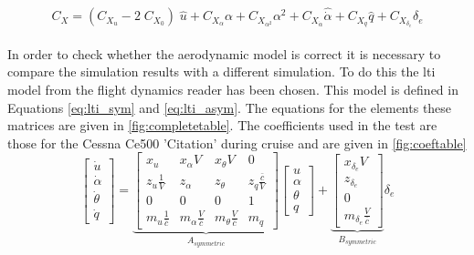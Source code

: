 \begin{equation}
\label{eq:c_x}
{C_X} = ({C_{{X_u}}} - 2\;{C_{{X_0}}})\;\hat u + {C_{{X_\alpha }}}\alpha  + {C_{{X_{{\alpha ^2}}}}}{\alpha ^2} + C_{{X_{\dot{\alpha}}}}\hat{\dot{\alpha}}  + {C_{{X_q}}}\hat q + {C_{{X_{{\delta _e}}}}}{\delta _e}
\end{equation}\\

In order to check whether the aerodynamic model is correct it is necessary to compare the simulation results with a different simulation. To do this the \gls{lti} model from the flight dynamics reader\cite{fdreader} has been chosen. This model is defined in Equations \ref{eq:lti_sym} and \ref{eq:lti_asym}. The equations for the elements these matrices are given in \autoref{fig:completetable}. The coefficients used in the test are those for the Cessna Ce500 'Citation' during cruise and are given in \autoref{fig:coeftable}\\


\begin{equation}
\label{eq:lti_sym}
\left[ {\begin{array}{*{20}{c}}
    {\dot u} \\ 
    {\dot \alpha } \\ 
    {\dot \theta } \\ 
    {\dot q} 
\end{array}} \right] = \underbrace {\left[ {\begin{array}{*{20}{c}}
    {{x_u}}&{{x_\alpha }V}&{{x_\theta }V}&0 \\ 
    {{z_u}\tfrac{1}{V}}&{{z_\alpha }}&{{z_\theta }}&{{z_q}\tfrac{{\bar c}}{V}} \\ 
    0&0&0&1 \\ 
    {{m_u}\tfrac{1}{{\bar c}}}&{{m_\alpha }\tfrac{V}{{\bar c}}}&{{m_\theta }\tfrac{V}{{\bar c}}}&{{m_q}} 
\end{array}} \right]}_{{A_{symmetric}}}\left[ {\begin{array}{*{20}{c}}
    u \\ 
    \alpha  \\ 
    \theta  \\ 
    q 
\end{array}} \right] + \underbrace {\left[ {\begin{array}{*{20}{c}}
    {{x_{{\delta _e}}}V} \\ 
    {{z_{{\delta _e}}}} \\ 
    0 \\ 
    {{m_{{\delta _e}}}\tfrac{V}{{\bar c}}} 
\end{array}} \right]}_{{B_{symmetric}}}{\delta _e}
\end{equation}


